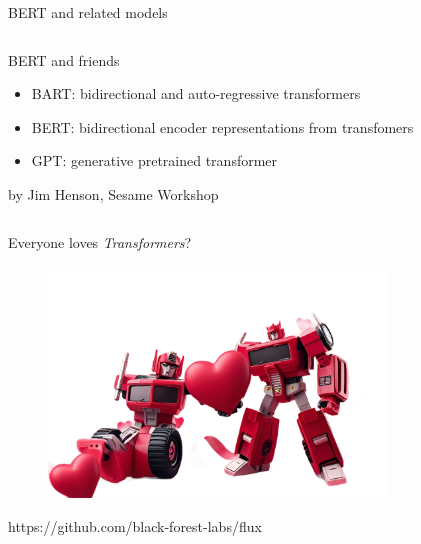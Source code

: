 \documentclass[10pt]{beamer}
\newcommand{\creditdark}[1]{{\par \raggedleft \scriptsize \mdseries \color{scMGray} #1 \par}}
\newcommand{\creditleft}[1]{{\par \raggedright \scriptsize \mdseries \color{mDarkBrown} #1 \par}}
\begin{document}
\begin{frame}{BERT and related models}
\begin{columns}[T,onlytextwidth]
			\begin{exampleblock}{BERT and friends}
				\vspace{0.2cm}
				\begin{itemize}
					\item BART: bidirectional and auto-regressive transformers
					\item BERT: bidirectional encoder representations from transfomers
					\item GPT: generative pretrained transformer
				\end{itemize}
				\creditleft{by Jim Henson, Sesame Workshop}
			\end{exampleblock}
		\end{columns}
\end{frame}

\begin{frame}[standout]{Everyone loves \emph{Transformers}?}
	\begin{figure}
		\includegraphics[width=0.8\textwidth]{figures/Transformer_models.png}
	\end{figure}
			\creditdark{https://github.com/black-forest-labs/flux}
\end{frame}
\end{document}
